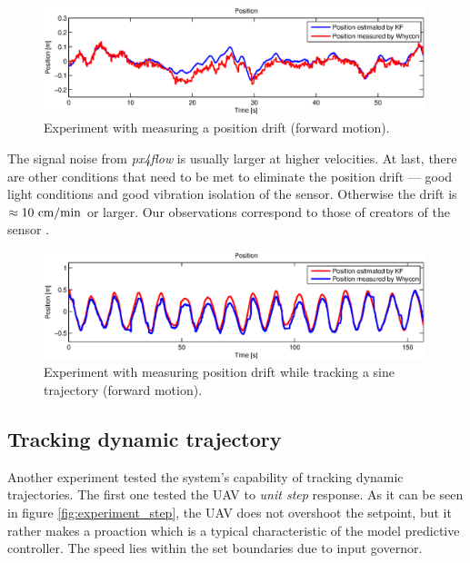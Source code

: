 \begin{figure}[H]
\centering
\includegraphics[width=0.99\textwidth]{fig/experiment5_drift_constant.eps}
\caption{Experiment with measuring a position drift (forward motion).}
\label{fig:experiment_drift_constant}
\end{figure}

The signal noise from \emph{px4flow} is usually larger at higher velocities. At last, there are other conditions that need to be met to eliminate the position drift --- good light conditions and good vibration isolation of the sensor. Otherwise the drift is $\approx 10~\mathrm{cm/min}$ or larger. Our observations correspond to those of creators of the sensor \citep{honegger2013open}.

\begin{figure}[H]
\centering
\includegraphics[width=0.99\textwidth]{fig/experiment5_drift_sine.eps}
\caption{Experiment with measuring position drift while tracking a sine trajectory (forward motion).}
\label{fig:experiment_drift_sine}
\end{figure}

\subsection{Tracking dynamic trajectory}
\label{cap:dynamic_trajectory_tracking}

Another experiment tested the system's capability of tracking dynamic trajectories. The first one tested the UAV to \emph{unit step} response. As it can be seen in figure \ref{fig:experiment_step}, the UAV does not overshoot the setpoint, but it rather makes a proaction which is a typical characteristic of the model predictive controller. The speed lies within the set boundaries due to input governor.

